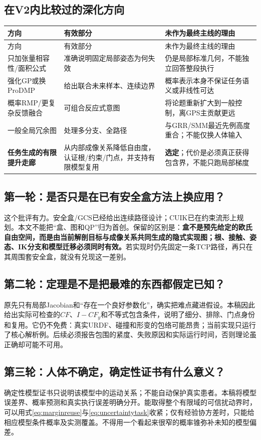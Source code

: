 \documentclass[UTF8,11pt,a4paper,fontset=fandol]{ctexart}
\numberwithin{equation}{section}
\theoremstyle{definition}
\begin{document}
\subsection{在V2内比较过的深化方向}
\begin{longtable}{p{}p{}p{}}
\toprule 方向 & 有效部分 & 未作为最终主线的理由\\\midrule\endfirsthead
\toprule 方向 & 有效部分 & 未作为最终主线的理由\\\midrule\endhead
只加张量相容性/面积公式 & 准确说明固定局部姿态为何失效 & 仍是局部标准几何，不能独立回答整段执行\\
强化GP或换ProDMP & 给出联合未来样本、连续边界 & 概率表示本身不保证任务语义或非线性可达\\
概率RMP/更复杂反馈融合 & 可组合反应式意图 & 将论题重新扩大到一般控制，离GPS主贡献更远\\
一般全局冗余图 & 处理多分支、全路径 & 与GRR/SMM最近先例高度重合；不能仅换人体输入\\
\textbf{任务生成的有限提升走廊} & 从内部成像关系降低自由度，认证根/约束/门点，并支持有限模型复用 & \textbf{选定}；代价是必须真正获得包含界，不能只跑局部梯度\\\bottomrule
\end{longtable}

\subsection{第一轮：是否只是在已有安全盒方法上换应用？}
这个批评有力。安全盒/GCS已经给出连续路径设计；CUIK已在约束流形上规划。本文不能把“盒、图和QP”归为首创。保留的区别是：\textbf{盒不是预先给定的欧氏自由空间，而是由当前解剖目标与成像关系共同生成的隐式实现图；根、接触、姿态、IK分支和模型迁移必须同时有效。}若实现时仍先固定一条TCP路径，再只在其周围套安全盒，就没有兑现这一差别。

\subsection{第二轮：定理是不是把最难的东西都假定已知？}
原先只有局部Jacobian和“存在一个良好参数化”，确实把难点藏进假设。本稿因此给出实际可检查的$CF$、$I-CF_y$和不等式包含条件，说明了细分、排除、门点身份和复用。它仍不免费：真实URDF、碰撞和形变的包络可能昂贵；当前实现只运行了核心解析例。后续必须报告包围的紧度、失败原因和实际运行时间，否则理论虽正确却可能不可用。

\subsection{第三轮：人体不确定，确定性证书有什么意义？}
确定性模型证书只说明该模型中的运动关系；不能自动保护真实患者。本稿将模型误差界、概率预测和真实执行误差明确分开。能取得整个有限域的可信扰动界时，可以用式\eqref{eq:marginreuse}与\eqref{eq:uncertaintytask}收紧；仅有经验协方差时，只能给相应模型条件概率及实测覆盖。不得用一个看起来很窄的概率锥弥补未知的模型偏差。
\end{document}
